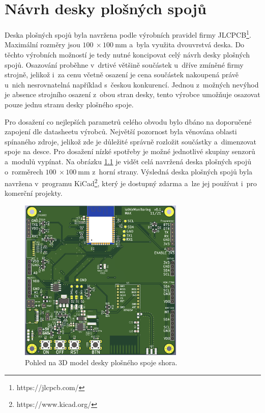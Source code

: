 \chapter{Návrh desky plošných spojů}

Deska plošných spojů byla navržena podle výrobních pravidel firmy JLCPCB\footnote{https://jlcpcb.com/}. Maximální rozměry jsou $\SI{100}{}\times \SI{100}{\milli\metre}$ a~byla využita dvouvrstvá deska. Do těchto výrobních možností je tedy nutné koncipovat celý návrh desky plošných spojů. Osazování proběhne v~drtivé většině součástek u~dříve zmíněné firmy strojně, jelikož i~za cenu včetně osazení je cena součástek nakoupená právě u~nich nesrovnatelná například s~českou konkurencí. Jednou z~možných nevýhod je absence strojního osazení z~obou stran desky, tento výrobce umožňuje osazovat pouze jednu stranu desky plošného spoje.

Pro dosažení co nejlepších parametrů celého obvodu bylo dbáno na doporučené zapojení dle datasheetu výrobců. Největší pozornost byla věnována oblasti spínaného zdroje, jelikož zde je důležité správně rozložit součástky a~dimenzovat spoje na desce. Pro dosažení nízké spotřeby je možné jednotlivé skupiny senzorů a~modulů vypínat. Na obrázku \ref{fig_PCB-top} je vidět celá navržená deska plošných spojů o~rozměrech $\SI{100}{}\times \SI{100}{\milli\metre}$ z~horní strany. Výsledná deska plošných spojů byla navržena v~programu KiCad\footnote{https://www.kicad.org/}, který je dostupný zdarma a~lze jej používat i~pro komerční projekty.

\begin{figure}[h]
    \centering
    \includegraphics[width=0.7\textwidth]{obrazky/PCB_top.png}
    \caption{Pohled na 3D model desky plošného spoje shora.}
    \label{fig_PCB-top}
\end{figure}